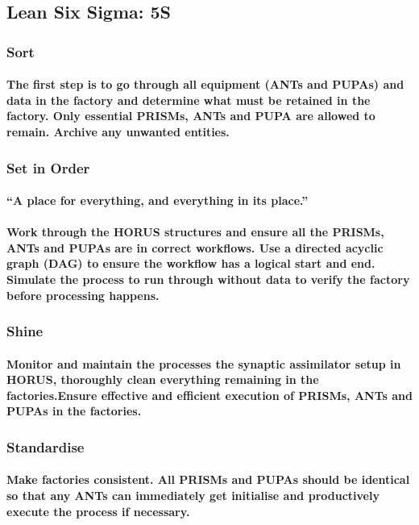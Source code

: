 \documentclass{acm_proc_article-sp}
\begin{document}
\subsection{Lean Six Sigma: 5S}
\subsubsection{Sort}
\paragraph{The first step is to go through all equipment (ANTs and PUPAs) and data in the factory and determine what must be retained in the factory. Only essential PRISMs, ANTs and PUPA are allowed to remain. Archive any unwanted entities.}
\subsubsection{Set in Order}
\paragraph{“A place for everything, and everything in its place.” }
\paragraph{Work through the HORUS structures and ensure all the PRISMs, ANTs and PUPAs are in correct workflows. Use a directed acyclic graph (DAG) to ensure the workflow has a logical start and end. Simulate the process to run through without data to verify the factory before processing happens.}
\subsubsection{Shine}
\paragraph{Monitor and maintain the processes the synaptic assimilator setup in HORUS, thoroughly clean everything remaining in the factories.Ensure effective and efficient execution of PRISMs, ANTs and PUPAs in the factories.}
\subsubsection{Standardise}
\paragraph{Make factories consistent. All PRISMs and PUPAs should be identical so that any ANTs can immediately get initialise and productively execute the process if necessary.}
\end{document}

